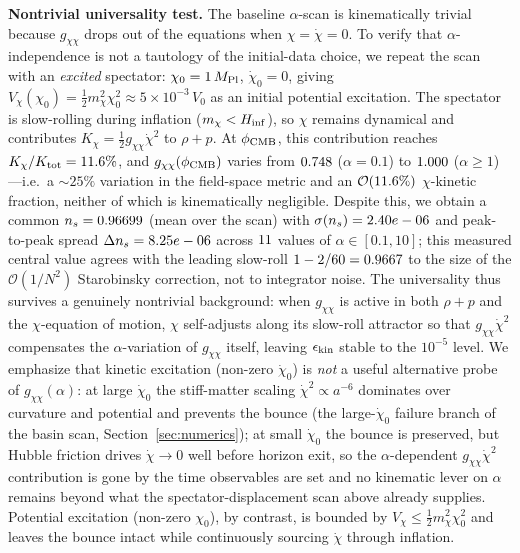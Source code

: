 \documentclass[11pt,a4paper]{article}
\begin{document}
\textbf{Nontrivial universality test.} The baseline $\alpha$-scan is kinematically trivial because $g_{\chi\chi}$ drops out of the equations when $\chi = \dot\chi = 0$. To verify that $\alpha$-independence is not a tautology of the initial-data choice, we repeat the scan with an \emph{excited} spectator: $\chi_0 = 1\,M_{\rm Pl}$, $\dot\chi_0 = 0$, giving $V_\chi(\chi_0) = \tfrac{1}{2}m_\chi^2\chi_0^2 \approx 5 \times 10^{-3}\,V_0$ as an initial potential excitation. The spectator is slow-rolling during inflation ($m_\chi < H_{\rm inf}$), so $\chi$ remains dynamical and contributes $K_\chi = \tfrac{1}{2}g_{\chi\chi}\dot\chi^2$ to $\rho+p$. At $\phi_{\rm CMB}$, this contribution reaches $K_\chi/K_{\rm tot} = 11.6\%$, and $g_{\chi\chi}(\phi_{\rm CMB})$ varies from $0.748$ ($\alpha=0.1$) to $1.000$ ($\alpha \geq 1$)---i.e.~a $\sim\!25\%$ variation in the field-space metric and an $\mathcal{O}(11.6\%)$ $\chi$-kinetic fraction, neither of which is kinematically negligible. Despite this, we obtain a common $n_s = 0.96699$ (mean over the scan) with $\sigma(n_s) = 2.40e-06$ and peak-to-peak spread $\Delta n_s = 8.25e-06$ across $11$ values of $\alpha \in [0.1, 10]$; this measured central value agrees with the leading slow-roll $1 - 2/60 = 0.9667$ to the size of the $\mathcal{O}(1/N^2)$ Starobinsky correction, not to integrator noise. The universality thus survives a genuinely nontrivial background: when $g_{\chi\chi}$ is active in both $\rho+p$ and the $\chi$-equation of motion, $\chi$ self-adjusts along its slow-roll attractor so that $g_{\chi\chi}\dot\chi^2$ compensates the $\alpha$-variation of $g_{\chi\chi}$ itself, leaving $\epsilon_{\rm kin}$ stable to the $10^{-5}$ level. We emphasize that kinetic excitation (non-zero $\dot\chi_0$) is \emph{not} a useful alternative probe of $g_{\chi\chi}(\alpha)$: at large $\dot\chi_0$ the stiff-matter scaling $\dot\chi^2 \propto a^{-6}$ dominates over curvature and potential and prevents the bounce (the large-$\dot\chi_0$ failure branch of the basin scan, Section~\ref{sec:numerics}); at small $\dot\chi_0$ the bounce is preserved, but Hubble friction drives $\dot\chi \to 0$ well before horizon exit, so the $\alpha$-dependent $g_{\chi\chi}\dot\chi^2$ contribution is gone by the time observables are set and no kinematic lever on $\alpha$ remains beyond what the spectator-displacement scan above already supplies. Potential excitation (non-zero $\chi_0$), by contrast, is bounded by $V_\chi \leq \tfrac{1}{2}m_\chi^2\chi_0^2$ and leaves the bounce intact while continuously sourcing $\dot\chi$ through inflation.
\end{document}
